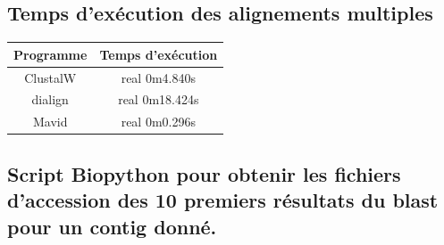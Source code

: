 \documentclass[10.9pt]{article} %
\begin{document}
\subsection{Temps d'exécution des alignements multiples}\label{24}
\begin{tabular}{|c|c|}
 \hline
 Programme & Temps d'exécution \\
 \hline
 ClustalW & real 0m4.840s \\
 \hline
 dialign & real 0m18.424s \\
 \hline
 Mavid & real 0m0.296s\\
 \hline
\end{tabular}

\subsection{Script Biopython pour obtenir les fichiers d'accession des 10 premiers résultats du blast
pour un contig donné.}\label{25}
\end{document}
